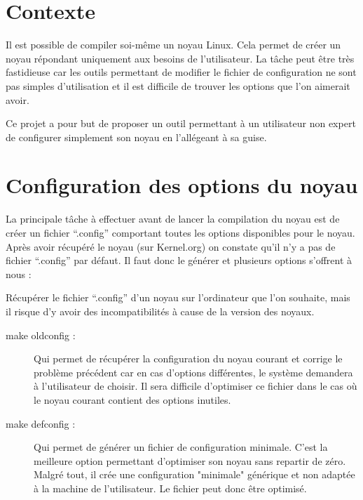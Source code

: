 \documentclass[16pts]{report}
\begin{document}

\nocite{*}

\chapter{Contexte}
Il est possible de compiler soi-même un noyau Linux. Cela permet de créer
    un noyau répondant uniquement aux besoins de l’utilisateur. La tâche peut
    être très fastidieuse car les outils permettant de modifier le fichier
    de configuration ne sont pas simples d’utilisation et il est difficile
    de trouver les options que l’on aimerait avoir.

Ce projet a pour but de proposer un outil permettant à un utilisateur non expert
    de configurer simplement son noyau en l'allégeant à sa guise.

\chapter{Configuration des options du noyau}
La principale tâche à effectuer avant de lancer la compilation du noyau est
    de créer un fichier “.config” comportant toutes les options disponibles
    pour le noyau.  Après avoir récupéré le noyau (sur Kernel.org) on constate
    qu’il n’y a pas de fichier “.config” par défaut. Il faut donc le générer et
    plusieurs options s’offrent à nous :

Récupérer le fichier “.config” d’un noyau sur l’ordinateur que l’on souhaite,
    mais il risque d’y avoir des incompatibilités à cause de la version
    des noyaux.

\begin{description}
    \item[make oldconfig :] Qui permet de récupérer la configuration du noyau
        courant et corrige le problème précédent car en cas d’options
        différentes, le système demandera à l’utilisateur de choisir. Il sera
        difficile d’optimiser ce fichier dans le cas où le noyau courant
        contient des options inutiles.

    \item[make defconfig :] Qui permet de générer un fichier de configuration
        minimale.  C’est la meilleure option permettant d’optimiser son noyau
        sans repartir de zéro.  Malgré tout, il crée une configuration
        "minimale" générique et non adaptée à la machine de l’utilisateur.
        Le fichier peut donc être optimisé.
\end{description}
\end{document}
